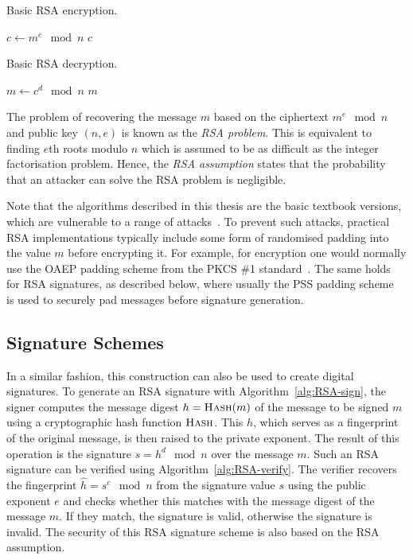 \begin{algorithm}[ht]
  \caption{Basic RSA encryption.}
  \label{alg:RSA-encrypt}
  \addtolength{\baselineskip}{1mm}
  \begin{algorithmic}[1]
      \State $c \gets m^e \mod n$
      \Return $c$
    \EndFunction
  \end{algorithmic}
\end{algorithm}
\begin{algorithm}[ht]
  \caption{Basic RSA decryption.}
  \label{alg:RSA-decrypt}
  \addtolength{\baselineskip}{1mm}
  \begin{algorithmic}[1]
      \State $m \gets c^d \mod n$
      \Return $m$
    \EndFunction
  \end{algorithmic}
\end{algorithm}

The problem of recovering the message $m$ based on the ciphertext $m^e \mod n$
and public key $(n, e)$ is known as the \emph{RSA problem}.
This is equivalent to finding $e$th roots modulo $n$ which is assumed to be as
difficult as the integer factorisation problem. Hence, the \emph{RSA assumption} states that
the probability that an attacker can solve the RSA problem is negligible.

Note that the algorithms described in this thesis are the basic textbook
versions, which are vulnerable to a range of attacks~\cite{Hastad1985,
Coppersmith1997}. To prevent such attacks, practical RSA implementations
typically include some form of randomised padding into the value $m$ before
encrypting it. For example, for encryption one would normally use the OAEP
padding scheme from the PKCS \#1 standard~\cite{PKCS_1}. The same holds for RSA
signatures, as described below, where usually the PSS padding
scheme~\cite{PKCS_1} is used to securely pad messages before signature
generation.

\subsection{Signature Schemes}

In a similar fashion, this construction can also be used to create digital
signatures. To generate an RSA signature with Algorithm~\ref{alg:RSA-sign}, the
signer computes the message digest $h = \Call{Hash}{m}$ of the message to be
signed $m$ using a cryptographic hash function $\Call{Hash}{}$. This $h$, which
serves as a fingerprint of the original message, is then raised to the private
exponent. The result of this operation is the signature $s = h^d \mod n$ over
the message $m$.
Such an RSA signature can be verified using Algorithm~\ref{alg:RSA-verify}. The
verifier recovers the fingerprint $\hat{h} = s^e \mod n$ from the signature
value $s$ using the public exponent $e$ and checks whether this matches with the
message digest of the message $m$. If they match, the signature is valid,
otherwise the signature is invalid. The security of this RSA signature scheme is
also based on the RSA assumption.

